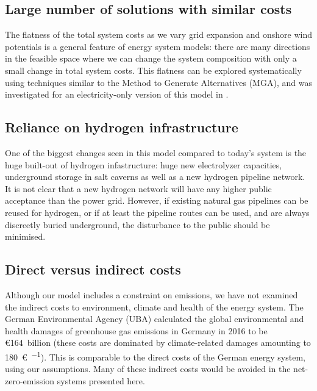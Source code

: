 \subsection*{Large number of solutions with similar costs}

The flatness of the total system costs as we vary grid expansion and
onshore wind potentials is a general feature of energy system models:
there are many directions in the feasible space where we can change
the system composition with only a small change in total system
costs. This flatness can be explored systematically using techniques similar to the Method to
Generate Alternatives (MGA), and was investigated for an
electricity-only version of this model in \cite{Neumann2019}.

\subsection*{Reliance on hydrogen infrastructure}

One of the biggest changes seen in this model compared to today's
system is the huge built-out of hydrogen infastructure: huge new
electrolyzer capacities, underground storage in salt caverns as well
as a new hydrogen pipeline network. It is not clear that a new
hydrogen network will have any higher public acceptance than the power
grid. However, if existing natural gas pipelines can be reused for hydrogen,
or if at least the pipeline routes can be used, and are always discreetly buried underground, the disturbance to
the public should be minimised.


\subsection*{Direct versus indirect costs}
\label{sec:indirect}

Although our model includes a constraint on \co emissions, we have
not examined the indirect costs to environment, climate and health of
the energy system. The German Environmental Agency (UBA) calculated
the global environmental and health damages of greenhouse gas
emissions in Germany in 2016 to be \euro164~billion \cite{UBA2019}
(these costs are dominated by climate-related damages amounting to
\SI{180}{\euro\per\tco}). This is comparable to the direct costs of the
German energy system, using our assumptions. Many of these indirect
costs would be avoided in the net-zero-emission systems presented
here.


